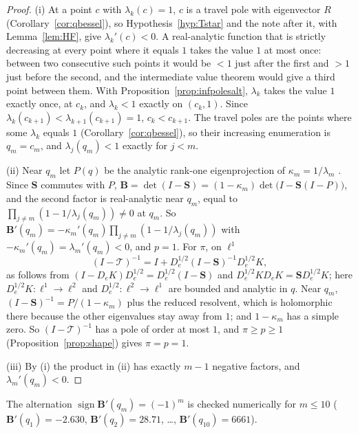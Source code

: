 \documentclass[11pt]{article}
\theoremstyle{plain}
\theoremstyle{definition}
\theoremstyle{remark}
\begin{document}
\begin{proof}
(i) At a point $c$ with $\lambda_k(c)=1$, $c$ is a travel pole with eigenvector $R$
(Corollary~\ref{cor:qbessel}), so Hypothesis~\ref{hyp:Tstar} and the note after it, with
Lemma~\ref{lem:HF}, give $\lambda_k'(c)<0$. A real-analytic function that is strictly decreasing at
every point where it equals $1$ takes the value $1$ at most once: between two consecutive such points
it would be $<1$ just after the first and $>1$ just before the second, and the intermediate value
theorem would give a third point between them. With Proposition~\ref{prop:infpolesalt}, $\lambda_k$
takes the value $1$ exactly once, at $c_k$, and $\lambda_k<1$ exactly on $(c_k,1)$. Since
$\lambda_k(c_{k+1})<\lambda_{k+1}(c_{k+1})=1$, $c_k<c_{k+1}$. The travel poles are the points where
some $\lambda_k$ equals $1$ (Corollary~\ref{cor:qbessel}), so their increasing enumeration is
$q_m=c_m$, and $\lambda_j(q_m)<1$ exactly for $j<m$.

(ii) Near $q_m$ let $P(q)$ be the analytic rank-one eigenprojection of $\kappa_m=1/\lambda_m$
\cite[Ch.~VII]{Kato}. Since $\mathbf S$ commutes with $P$,
$\mathbf B=\det(I-\mathbf S)=(1-\kappa_m)\det\bigl(I-\mathbf S(I-P)\bigr)$, and the second factor
is real-analytic near $q_m$, equal to $\prod_{j\ne m}(1-1/\lambda_j(q_m))\ne0$ at $q_m$. So
$\mathbf B'(q_m)=-\kappa_m'(q_m)\prod_{j\ne m}(1-1/\lambda_j(q_m))$ with
$-\kappa_m'(q_m)=\lambda_m'(q_m)<0$, and $p=1$. For $\pi$, on $\ell^1$
\[
   (I-\mathcal T)^{-1}=I+D_e^{1/2}(I-\mathbf S)^{-1}D_e^{1/2}K,
\]
as follows from $(I-D_eK)D_e^{1/2}=D_e^{1/2}(I-\mathbf S)$ and $D_e^{1/2}KD_eK=\mathbf SD_e^{1/2}K$;
here $D_e^{1/2}K:\ell^1\to\ell^2$ and $D_e^{1/2}:\ell^2\to\ell^1$ are bounded and analytic in $q$.
Near $q_m$, $(I-\mathbf S)^{-1}=P/(1-\kappa_m)$ plus the reduced resolvent, which is holomorphic
there because the other eigenvalues stay away from $1$; and $1-\kappa_m$ has a simple zero. So
$(I-\mathcal T)^{-1}$ has a pole of order at most $1$, and $\pi\ge p\ge1$
(Proposition~\ref{prop:shape}) gives $\pi=p=1$.

(iii) By (i) the product in (ii) has exactly $m-1$ negative factors, and $\lambda_m'(q_m)<0$.
\end{proof}

\noindent The alternation $\operatorname{sign}\mathbf B'(q_m)=(-1)^m$ is checked numerically for
$m\le10$ ($\mathbf B'(q_1)=-2.630$, $\mathbf B'(q_2)=28.71$, \dots, $\mathbf B'(q_{10})=6661$).
\end{document}
